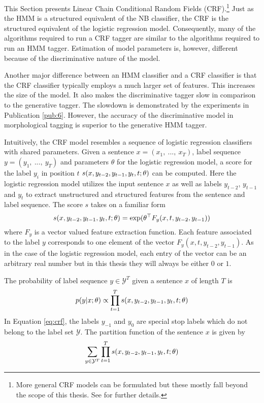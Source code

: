 This Section presents Linear Chain Conditional Random Fields
(CRF).\footnote{More general CRF models can be formulated but these
  mostly fall beyond the scope of this thesis. See \citep{Sutton2012}
  for further details.} Just as the HMM is a structured equivalent of
the NB classifier, the CRF is the structured equivalent of the
logistic regression model. Consequently, many of the algorithms required to run a CRF
tagger are similar to the algorithms required to run an HMM
tagger. Estimation of model parameters is, however, different because
of the discriminative nature of the model.

Another major difference between an HMM classifier and a CRF
classifier is that the CRF classifier typically employs a much larger
set of features. This increases the size of the model. It also makes
the discriminative tagger slow in comparison to the generative
tagger. The slowdown is demonstrated by the experiments in
Publication \ref{pub:6}. However, the accuracy of the discriminative
model in morphological tagging is superior to the generative HMM tagger.

Intuitively, the CRF model resembles a sequence of logistic regression classifiers
with shared parameters. Given a sentence $x = (x_1,\ ...,\ x_T)$,
label sequence $y = (y_1,\ ...,\ y_T)$ and parameters $\theta$ for the
logistic regression model, a score for the label $y_i$ in position $t$ $s(x, y_{t-2},
y_{t-1}, y_t, t\mbox{$ ; \, $} \theta)$ can be computed. Here the logistic regression model
utilizes the input sentence $x$ as well as labels $y_{t - 2}$, $y_{t-1}$ and
$y_t$ to extract unstructured and structured features from the
sentence and label sequence. The score $s$ takes on a familiar form
$$s(x, y_{t-2}, y_{t-1}, y_t, t\mbox{$ ; \, $} \theta) = \exp(\theta^\top F_y(x, t, y_{t-2}, y_{t-1}))$$
where $F_y$ is a vector valued feature extraction function. Each
feature associated to the label $y$ corresponds to one element of the
vector $F_y(x, t, y_{t-2}, y_{t-1})$. As in the case of the logistic regression model,
each entry of the vector can be an arbitrary real number but in this
thesis they will always be either $0$ or $1$.

The probability of label sequence $y \in \mathcal{Y}^T$ given a sentence $x$ of length $T$ is
\begin{equation}\label{eq:crf}p(y|x\mbox{$ ; \, $}\theta) \propto \prod_{t = 1}^T s(x, y_{t-2}, y_{t-1}, y_t, t\mbox{$ ; \, $} \theta)\end{equation}
In Equation \ref{eq:crf}, the labels $y_{-1}$ and $y_0$ are special
stop labels which do not belong to the label set $\mathcal{Y}$. The partition function of the sentence $x$ is given by
\begin{equation}\sum_{y\in \mathcal{Y}^T}\prod_{t = 1}^T s(x, y_{t-2}, y_{t-1}, y_t, t\mbox{$ ; \, $} \theta)\end{equation}

